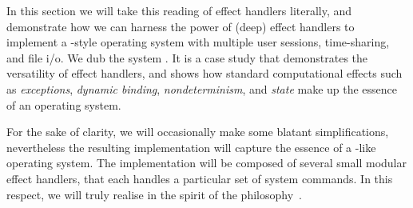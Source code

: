 \documentclass[12pt,phd,lfcs,twoside,openright,logo,leftchapter,normalheadings]{infthesis}
\theoremstyle{plain}
\theoremstyle{definition}
\begin{document}
In this section we will take this reading of effect handlers
literally, and demonstrate how we can harness the power of (deep)
effect handlers to implement a \UNIX{}-style operating system with
multiple user sessions, time-sharing, and file i/o. We dub the system
\OSname{}.
%
It is a case study that demonstrates the versatility of effect
handlers, and shows how standard computational effects such as
\emph{exceptions}, \emph{dynamic binding}, \emph{nondeterminism}, and
\emph{state} make up the essence of an operating system.

For the sake of clarity, we will occasionally make some blatant
simplifications, nevertheless the resulting implementation will
capture the essence of a \UNIX{}-like operating system.
%
The implementation will be composed of several small modular effect
handlers, that each handles a particular set of system commands. In
this respect, we will truly realise \OSname{} in the spirit of the
\UNIX{} philosophy~\cite[Section~1.6]{Raymond03}.


\end{document}
